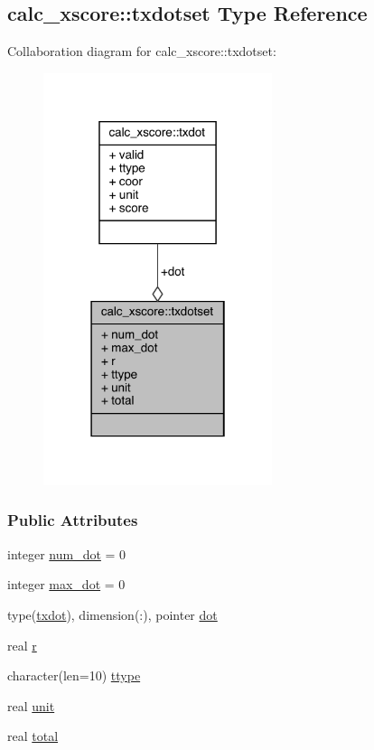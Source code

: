 \hypertarget{structcalc__xscore_1_1txdotset}{\subsection{calc\-\_\-xscore\-:\-:txdotset Type Reference}
\label{structcalc__xscore_1_1txdotset}
}


Collaboration diagram for calc\-\_\-xscore\-:\-:txdotset\-:
\nopagebreak
\begin{figure}[H]
\begin{center}
\leavevmode
\includegraphics[width=190pt]{structcalc__xscore_1_1txdotset__coll__graph}
\end{center}
\end{figure}
\subsubsection*{Public Attributes}
\begin{DoxyCompactItemize}
\item 
integer \hyperlink{structcalc__xscore_1_1txdotset_a6568371b84c0207109a619d0f39c8cc9}{num\-\_\-dot} = 0
\item 
integer \hyperlink{structcalc__xscore_1_1txdotset_a60526972e3776bf8ba4ac06ebf808888}{max\-\_\-dot} = 0
\item 
type(\hyperlink{structcalc__xscore_1_1txdot}{txdot}), dimension(\-:), pointer \hyperlink{structcalc__xscore_1_1txdotset_a3fe8e9a3664a7ed0efb20b551bfd56f6}{dot}
\item 
real \hyperlink{structcalc__xscore_1_1txdotset_ad4bb76a7eca398ff04daab81d3c829d5}{r}
\item 
character(len=10) \hyperlink{structcalc__xscore_1_1txdotset_a55b01224d1ac5029de545fcc81f8be39}{ttype}
\item 
real \hyperlink{structcalc__xscore_1_1txdotset_a0c46438a3849ee4862425ed0f1578faf}{unit}
\item 
real \hyperlink{structcalc__xscore_1_1txdotset_ac40f50b0fdaeb5202bba7b91b5a98f6b}{total}
\end{DoxyCompactItemize}


